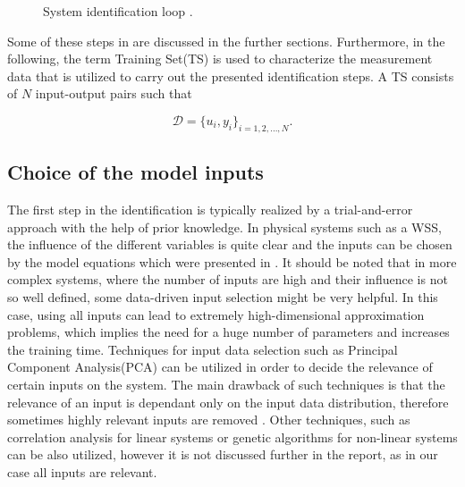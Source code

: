 \begin{figure}[H]
\centering
 
\caption{System identification loop \cite{nelles2013nonlinear}.}
\label{fig:identification_loop}
\end{figure}

\vspace{-3mm}

Some of these steps in  are discussed in the further sections. Furthermore, in the following, the term Training Set(TS) is used to characterize the measurement data that is utilized to carry out the presented identification steps. A TS consists of $N$ input-output pairs such that

\begin{equation}
  \label{training set}
  \mathcal{D} = \{u_i , y_i\}_{i = 1,2, ..., N}.
\end{equation}

\subsection{Choice of the model inputs}
\label{choice_of_the_model_inputs}

The first step in the identification is typically realized by a trial-and-error approach with the help of prior knowledge. In physical systems such as a WSS, the influence of the different variables is quite clear and the inputs can be chosen by the model equations which were presented in . It should be noted that in more complex systems, where the number of inputs are high and their influence is not so well defined, some data-driven input selection might be very helpful. In this case, using all inputs can lead to extremely high-dimensional approximation problems, which implies the need for a huge number of parameters and increases the training time. Techniques for input data selection such as Principal Component Analysis(PCA) can be utilized in order to decide the relevance of certain inputs on the system. The main drawback of such techniques is that the relevance of an input is dependant only on the input data distribution, therefore sometimes highly relevant inputs are removed \cite{nelles2013nonlinear}.  Other techniques, such as correlation analysis for linear systems or genetic algorithms for non-linear systems can be also utilized, however it is not discussed further in the report, as in our case all inputs are relevant. 


